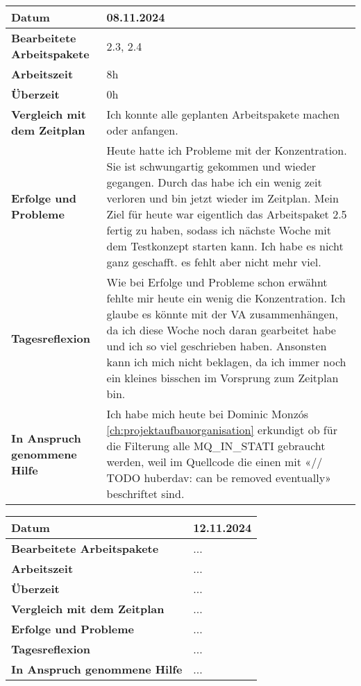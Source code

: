 \begin{longtable}{p{}|p{}}
	\hline
	\textbf{Datum}                       & 08.11.2024            \\
	\hline
	\textbf{Bearbeitete Arbeitspakete}   & 2.3, 2.4                  \\
	\hline
	\textbf{Arbeitszeit}                 & 8h                                    \\
	\hline
	\textbf{Überzeit}                    & 0h                                    \\
	\hline
	\textbf{Vergleich mit dem Zeitplan}  & Ich konnte alle geplanten Arbeitspakete machen oder anfangen.  \\
	\hline
	\textbf{Erfolge und Probleme} & Heute hatte ich Probleme mit der Konzentration. Sie ist schwungartig gekommen und wieder gegangen. Durch das habe ich ein wenig zeit verloren und bin jetzt wieder im Zeitplan. Mein Ziel für heute war eigentlich das Arbeitspaket 2.5 fertig zu haben, sodass ich nächste Woche mit dem Testkonzept starten kann. Ich habe es nicht ganz geschafft. es fehlt aber nicht mehr viel.
	\\
	\hline
	\textbf{Tagesreflexion} & Wie bei Erfolge und Probleme schon erwähnt fehlte mir heute ein wenig die Konzentration. Ich glaube es könnte mit der VA zusammenhängen, da ich diese Woche noch daran gearbeitet habe und ich so viel geschrieben haben. Ansonsten kann ich mich nicht beklagen, da ich immer noch ein kleines bisschen im Vorsprung zum Zeitplan bin.
	\\
	\hline
	\textbf{In Anspruch genommene Hilfe} & Ich habe mich heute bei Dominic Monzós \ref{ch:projektaufbauorganisation} erkundigt ob für die Filterung alle MQ\_IN\_STATI gebraucht werden, weil im Quellcode die einen mit «// TODO huberdav: can be removed eventually» beschriftet sind.                               \\
	\hline
\end{longtable}\label{tab:arbeitsprotokoll-08.11.2024}
\newpage

\begin{longtable}{p{}|p{}}
	\hline
	\textbf{Datum}                       & 12.11.2024            \\
	\hline
	\textbf{Bearbeitete Arbeitspakete}   & ...                  \\
	\hline
	\textbf{Arbeitszeit}                 & ...                                    \\
	\hline
	\textbf{Überzeit}                    & ...                                    \\
	\hline
	\textbf{Vergleich mit dem Zeitplan}  & ... \\
	\hline
	\textbf{Erfolge und Probleme} & ...
	\\
	\hline
	\textbf{Tagesreflexion} & ...
	\\
	\hline
	\textbf{In Anspruch genommene Hilfe} & ...                              \\
	\hline
\end{longtable}\label{tab:arbeitsprotokoll-12.11.2024}
\newpage

